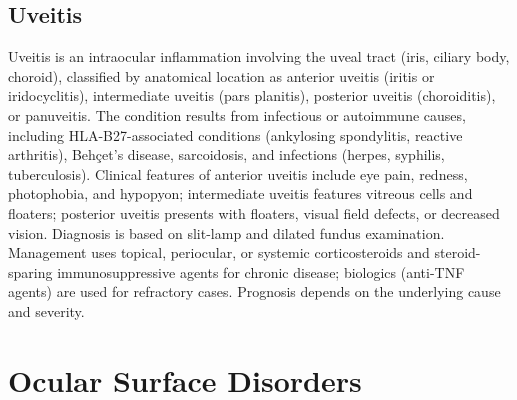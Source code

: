 \subsection{Uveitis}
\label{sec:Uveitis}
Uveitis is an intraocular inflammation involving the uveal tract (iris, ciliary body, choroid), classified by anatomical location as anterior uveitis (iritis or iridocyclitis), intermediate uveitis (pars planitis), posterior uveitis (choroiditis), or panuveitis. The condition results from infectious or autoimmune causes, including HLA-B27-associated conditions (ankylosing spondylitis, reactive arthritis), Beh\c{c}et's disease, sarcoidosis, and infections (herpes, syphilis, tuberculosis). Clinical features of anterior uveitis include eye pain, redness, photophobia, and hypopyon; intermediate uveitis features vitreous cells and floaters; posterior uveitis presents with floaters, visual field defects, or decreased vision. Diagnosis is based on slit-lamp and dilated fundus examination. Management uses topical, periocular, or systemic corticosteroids and steroid-sparing immunosuppressive agents for chronic disease; biologics (anti-TNF agents) are used for refractory cases. Prognosis depends on the underlying cause and severity.

\section{Ocular Surface Disorders}








\label{sec:Ocular Surface Disorders}

